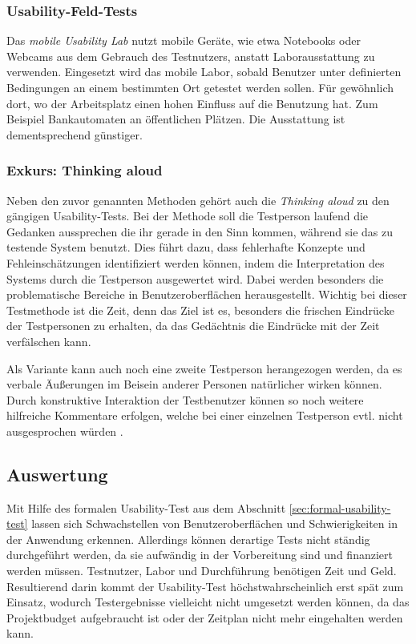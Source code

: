 \subsubsection{Usability-Feld-Tests}

Das \textit{mobile Usability Lab} nutzt mobile Geräte, wie etwa Notebooks oder Webcams aus dem Gebrauch des Testnutzers, anstatt Laborausstattung zu verwenden. 
Eingesetzt wird das mobile Labor, sobald Benutzer unter definierten Bedingungen an einem bestimmten Ort getestet werden sollen. 
Für gewöhnlich dort, wo der Arbeitsplatz einen hohen Einfluss auf die Benutzung hat. 
Zum Beispiel Bankautomaten an öffentlichen Plätzen. 
Die Ausstattung ist dementsprechend günstiger. \cite[vgl.][93\psq]{usabilityEngineeringKompakt}

\subsubsection{Exkurs: Thinking aloud\label{sec:thinking_aloud}}
Neben den zuvor genannten Methoden gehört auch die \emph{Thinking aloud} zu den gängigen Usability-Tests.
Bei der Methode soll die Testperson laufend die Gedanken aussprechen die ihr gerade in den Sinn kommen, während sie das zu testende System benutzt.
Dies führt dazu, dass fehlerhafte Konzepte und Fehleinschätzungen identifiziert werden können, indem die Interpretation des Systems durch die Testperson ausgewertet wird.
Dabei werden besonders die problematische Bereiche in Benutzeroberflächen herausgestellt.
Wichtig bei dieser Testmethode ist die Zeit, denn das Ziel ist es, besonders die frischen Eindrücke der Testpersonen zu erhalten, da das Gedächtnis die Eindrücke mit der Zeit verfälschen kann.

Als Variante kann auch noch eine zweite Testperson herangezogen werden, da es verbale Äußerungen im Beisein anderer Personen natürlicher wirken können.
Durch konstruktive Interaktion der Testbenutzer können so noch weitere hilfreiche Kommentare erfolgen, welche bei einer einzelnen Testperson evtl. nicht ausgesprochen würden \cite[vgl.][73\psq]{usability_engineering_software_developers}.


\cite{usabilityblog_wasBeachten}

\cite{usabilityblog_eResult}

\subsection{Auswertung}

Mit Hilfe des formalen Usability-Test aus dem Abschnitt \ref{sec:formal-usability-test} lassen sich Schwachstellen von Benutzeroberflächen und Schwierigkeiten in der Anwendung erkennen.
Allerdings können derartige Tests nicht ständig durchgeführt werden, da sie aufwändig in der Vorbereitung sind und finanziert werden müssen. 
Testnutzer, Labor und Durchführung benötigen Zeit und Geld. 
Resultierend darin kommt der Usability-Test höchstwahrscheinlich erst spät zum Einsatz, wodurch Testergebnisse vielleicht nicht umgesetzt werden können, da das Projektbudget aufgebraucht ist oder der Zeitplan nicht mehr eingehalten werden kann. 

